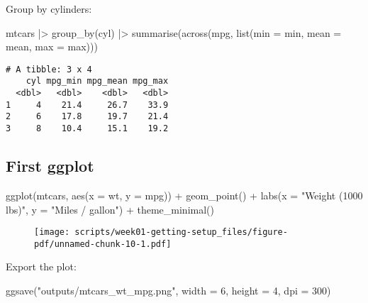 \documentclass[
  letterpaper,
  DIV=11,
  numbers=noendperiod]{scrreprt}
\newenvironment{Shaded}{\begin{snugshade}}{\end{snugshade}}
\newcommand{\AttributeTok}[1]{\textcolor[rgb]{0.40,0.45,0.13}{#1}}
\newcommand{\DecValTok}[1]{\textcolor[rgb]{0.68,0.00,0.00}{#1}}
\newcommand{\FunctionTok}[1]{\textcolor[rgb]{0.28,0.35,0.67}{#1}}
\newcommand{\NormalTok}[1]{\textcolor[rgb]{0.00,0.23,0.31}{#1}}
\newcommand{\SpecialCharTok}[1]{\textcolor[rgb]{0.37,0.37,0.37}{#1}}
\newcommand{\StringTok}[1]{\textcolor[rgb]{0.13,0.47,0.30}{#1}}
\begin{document}
Group by cylinders:

\begin{Shaded}
\begin{Highlighting}[]
\NormalTok{mtcars }\SpecialCharTok{|\textgreater{}}
  \FunctionTok{group\_by}\NormalTok{(cyl) }\SpecialCharTok{|\textgreater{}}
  \FunctionTok{summarise}\NormalTok{(}\FunctionTok{across}\NormalTok{(mpg, }\FunctionTok{list}\NormalTok{(}\AttributeTok{min =}\NormalTok{ min,}
                             \AttributeTok{mean =}\NormalTok{ mean,}
                             \AttributeTok{max =}\NormalTok{ max)))}
\end{Highlighting}
\end{Shaded}

\begin{verbatim}
# A tibble: 3 x 4
    cyl mpg_min mpg_mean mpg_max
  <dbl>   <dbl>    <dbl>   <dbl>
1     4    21.4     26.7    33.9
2     6    17.8     19.7    21.4
3     8    10.4     15.1    19.2
\end{verbatim}

\hypertarget{first-ggplot}{%
\subsection{First ggplot}\label{first-ggplot}}

\begin{Shaded}
\begin{Highlighting}[]
\FunctionTok{ggplot}\NormalTok{(mtcars, }\FunctionTok{aes}\NormalTok{(}\AttributeTok{x =}\NormalTok{ wt, }\AttributeTok{y =}\NormalTok{ mpg)) }\SpecialCharTok{+}
  \FunctionTok{geom\_point}\NormalTok{() }\SpecialCharTok{+}
  \FunctionTok{labs}\NormalTok{(}\AttributeTok{x =} \StringTok{"Weight (1000 lbs)"}\NormalTok{, }\AttributeTok{y =} \StringTok{"Miles / gallon"}\NormalTok{) }\SpecialCharTok{+}
  \FunctionTok{theme\_minimal}\NormalTok{()}
\end{Highlighting}
\end{Shaded}

\begin{figure}[H]

{\centering \texttt{[image: scripts/week01-getting-setup\_files/figure-pdf/unnamed-chunk-10-1.pdf]}

}

\end{figure}

Export the plot:

\begin{Shaded}
\begin{Highlighting}[]
\FunctionTok{ggsave}\NormalTok{(}\StringTok{"outputs/mtcars\_wt\_mpg.png"}\NormalTok{, }\AttributeTok{width =} \DecValTok{6}\NormalTok{, }\AttributeTok{height =} \DecValTok{4}\NormalTok{, }\AttributeTok{dpi =} \DecValTok{300}\NormalTok{)}
\end{Highlighting}
\end{Shaded}
\end{document}
